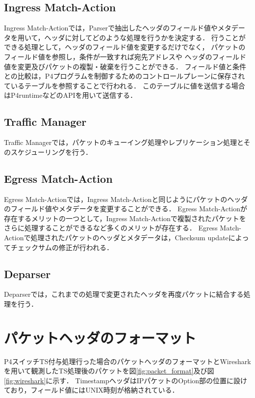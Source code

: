 \documentclass[a4j,11pt]{jreport}
\begin{document}
\subsection{Ingress Match-Action}
Ingress Match-Actionでは，Parserで抽出したヘッダのフィールド値やメタデータを用いて，ヘッダに対してどのような処理を行うかを決定する．
行うことができる処理として，ヘッダのフィールド値を変更するだけでなく，
パケットのフィールド値を参照し，条件が一致すれば宛先アドレスや
ヘッダのフィールド値を変更及びパケットの複製・破棄を行うことができる．
フィールド値と条件との比較は，P4プログラムを制御するためのコントロールプレーンに保存されているテーブルを参照することで行われる．
このテーブルに値を送信する場合はP4runtimeなどのAPIを用いて送信する．

\subsection{Traffic Manager}
Traffic Managerでは，パケットのキューイング処理やレプリケーション処理とそのスケジューリングを行う．

\subsection{Egress Match-Action}
Egress Match-Actionでは，Ingress Match-Actionと同じようにパケットのヘッダのフィールド値やメタデータを変更することができる．
Egress Match-Actionが存在するメリットの一つとして，Ingress Match-Actionで複製されたパケットをさらに処理することができるなど多くのメリットが存在する．
Egress Match-Actionで処理されたパケットのヘッダとメタデータは，Checksum updateによってチェックサムの修正が行われる．

\subsection{Deparser}
Deparserでは，これまでの処理で変更されたヘッダを再度パケットに結合する処理を行う．


\section{パケットヘッダのフォーマット}
P4スイッチTS付与処理行った場合のパケットへッダのフォーマットとWiresharkを用いて観測したTS処理後のパケットを図\ref{fig:packet_format}及び図\ref{fig:wireshark}に示す．
TimestampヘッダはIPパケットのOption部の位置に設けており，フィールド値にはUNIX時刻が格納されている．
\end{document}
